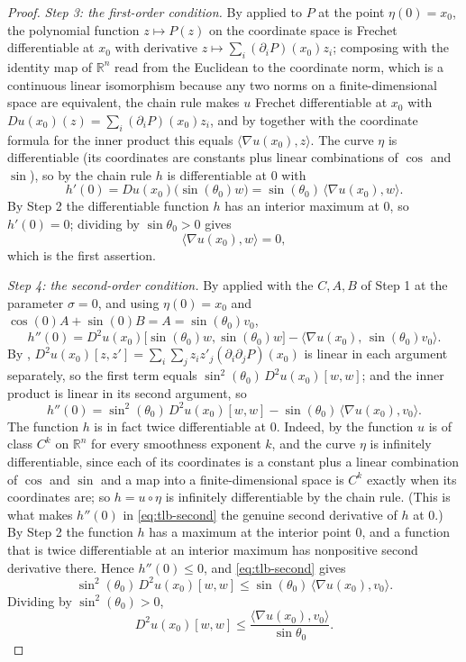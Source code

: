 \begin{proof}
\emph{Step 3: the first-order condition.} By  applied to
$P$ at the point $\eta(0)=x_0$, the polynomial function $z\mapsto P(z)$ on the
coordinate space is Frechet differentiable at $x_0$ with derivative
$z\mapsto\sum_i(\partial_iP)(x_0)z_i$; composing with the identity map of
$\mathbb{R}^n$ read from the Euclidean to the coordinate norm, which is a
continuous linear isomorphism because any two norms on a finite-dimensional
space are equivalent, the chain rule makes $u$ Frechet differentiable at $x_0$
with $Du(x_0)(z)=\sum_i(\partial_iP)(x_0)z_i$, and by 
together with the coordinate formula for the inner product this equals
$\langle\nabla u(x_0),z\rangle$. The curve $\eta$ is differentiable (its
coordinates are constants plus linear combinations of $\cos$ and $\sin$), so by
the chain rule $h$ is differentiable at $0$ with
\[
  h'(0)=Du(x_0)\bigl(\sin(\theta_0)w\bigr)=\sin(\theta_0)\,\langle\nabla u(x_0),w\rangle .
\]
By Step 2 the differentiable function $h$ has an interior maximum at $0$, so
$h'(0)=0$; dividing by $\sin\theta_0>0$ gives
\begin{equation}\label{eq:tlb-first}
  \bigl\langle\nabla u(x_0),w\rangle=0 ,
\end{equation}
which is the first assertion.

\emph{Step 4: the second-order condition.} By 
applied with the $C,A,B$ of Step 1 at the parameter $\sigma=0$, and using
$\eta(0)=x_0$ and $\cos(0)A+\sin(0)B=A=\sin(\theta_0)v_0$,
\[
  h''(0)=D^2u(x_0)\bigl[\sin(\theta_0)w,\sin(\theta_0)w\bigr]
   -\bigl\langle\nabla u(x_0),\,\sin(\theta_0)v_0\bigr\rangle .
\]
By , $D^2u(x_0)[z,z']=\sum_i\sum_j z_i z'_j(\partial_i\partial_jP)(x_0)$
is linear in each argument separately, so the first term equals
$\sin^2(\theta_0)\,D^2u(x_0)[w,w]$; and the inner product is linear in its second
argument, so
\begin{equation}\label{eq:tlb-second}
  h''(0)=\sin^2(\theta_0)\,D^2u(x_0)[w,w]
   -\sin(\theta_0)\,\langle\nabla u(x_0),v_0\rangle .
\end{equation}
The function $h$ is in fact twice differentiable at $0$. Indeed, by
 the function $u$ is of class $C^k$ on $\mathbb{R}^n$ for
every smoothness exponent $k$, and the curve $\eta$ is infinitely
differentiable, since each of its coordinates is a constant plus a linear
combination of $\cos$ and $\sin$ and a map into a finite-dimensional space is
$C^k$ exactly when its coordinates are; so $h=u\circ\eta$ is infinitely
differentiable by the chain rule. (This is what makes $h''(0)$ in
\eqref{eq:tlb-second} the genuine second derivative of $h$ at $0$.) By Step 2
the function $h$ has a maximum at the interior point $0$, and a function that is
twice differentiable at an interior maximum has nonpositive second derivative
there. Hence $h''(0)\le0$, and \eqref{eq:tlb-second} gives
\[
  \sin^2(\theta_0)\,D^2u(x_0)[w,w]\le\sin(\theta_0)\,\langle\nabla u(x_0),v_0\rangle .
\]
Dividing by $\sin^2(\theta_0)>0$,
\begin{equation}\label{eq:tlb-div}
  D^2u(x_0)[w,w]\le\frac{\langle\nabla u(x_0),v_0\rangle}{\sin\theta_0}.
\end{equation}


\end{proof}
